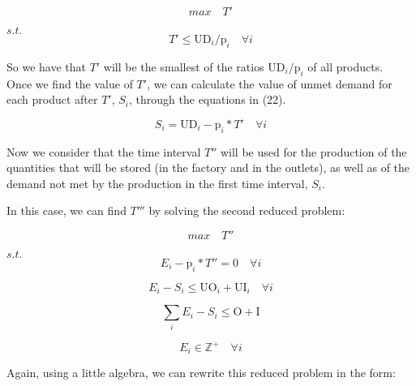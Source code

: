 \documentclass[preprint,12pt,authoryear]{elsarticle}
\begin{document}
\begin{equation}
max \quad T'
\end{equation}

$s.t.$ \\

\begin{equation}
T'  \leq \textrm{UD}_i / \textrm{p}_i \quad \forall i
\end{equation}

So we have that $T'$ will be the smallest of the ratios $\textrm{UD}_i / \textrm{p}_i$ of all products. \\

Once we find the value of $T'$, we can calculate the value of unmet demand for each product after $T'$, $S_i$, through the equations in (22).

\begin{equation}
S_i = \textrm{UD}_i - \textrm{p}_i * T' \quad \forall i
\end{equation}

Now we consider that the time interval $T''$ will be used for the production of the quantities that will be stored (in the factory and in the outlets), as well as of the demand not met by the production in the first time interval, $S_i$. 

In this case, we can find $T'''$ by solving the second reduced problem:

\begin{equation}
max \quad T''
\end{equation}

$s.t.$ \\

\begin{equation}
E_i - \textrm{p}_i * T''  = 0 \quad \forall i
\end{equation}

\begin{equation}
E_i - S_i \leq \textrm{UO}_i + \textrm{UI}_i \quad \forall i
\end{equation}

\begin{equation}
\sum_i {E_i - S_i} \leq \textrm{O} + \textrm{I}
\end{equation}

\begin{equation}
E_i \in  \mathbb{Z}^+ \quad \forall i
\end{equation}

Again, using a little algebra, we can rewrite this reduced problem in the form:
\end{document}
